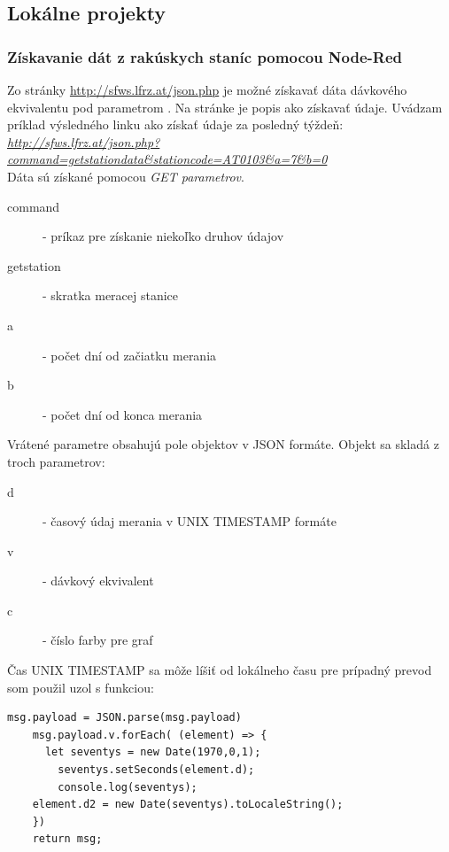 

\subsection{Lokálne projekty}
\subsubsection{Získavanie dát z rakúskych staníc pomocou Node-Red}
Zo stránky \url{http://sfws.lfrz.at/json.php} je možné získavať dáta dávkového ekvivalentu pod parametrom . Na stránke je popis ako získavať údaje. Uvádzam príklad výsledného linku ako získať údaje za posledný týždeň: \\
\small{\textit{\url{http://sfws.lfrz.at/json.php?command=getstationdata&stationcode=AT0103&a=7&b=0}}}\\
Dáta sú získané pomocou \textit{GET parametrov}. 


\begin{multicols}{2}
    \begin{description}
        \item[command] - príkaz pre získanie niekoľko druhov údajov
        \item[getstation] - skratka meracej stanice
        \item[a] - počet dní od začiatku merania
        \item[b] - počet dní od konca merania
    \end{description}
\end{multicols}
Vrátené parametre obsahujú pole objektov v JSON formáte. Objekt sa skladá z troch parametrov:
\begin{multicols}{2}
\begin{description}
        \item[d] - časový údaj merania v UNIX TIMESTAMP formáte
        \item[v] - dávkový ekvivalent
        \item[c] - číslo farby pre graf
\end{description}
\end{multicols}
\newpage
Čas UNIX TIMESTAMP sa môže líšiť od lokálneho času pre prípadný prevod som použil uzol s funkciou:
\begin{lstlisting}[style=htmlcssjs]
    msg.payload = JSON.parse(msg.payload)
    msg.payload.v.forEach( (element) => {
      let seventys = new Date(1970,0,1);
        seventys.setSeconds(element.d);
        console.log(seventys);
    element.d2 = new Date(seventys).toLocaleString();
    })
    return msg;
\end{lstlisting}


